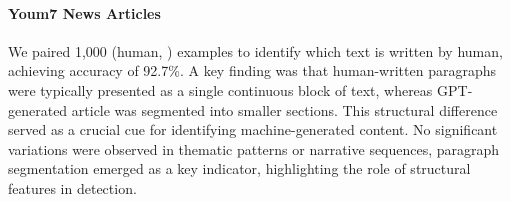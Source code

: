 

\paragraph{Youm7 News Articles}



We paired 1,000 (human, \gptfouro) examples to identify which text is written by human, achieving accuracy of 92.7\%.
A key finding was that human-written paragraphs were typically presented as a single continuous block of text, whereas GPT-generated article was segmented into smaller sections. This structural difference served as a crucial cue for identifying machine-generated content. No significant variations were observed in thematic patterns or narrative sequences, paragraph segmentation emerged as a key indicator, highlighting the role of structural features in detection.



